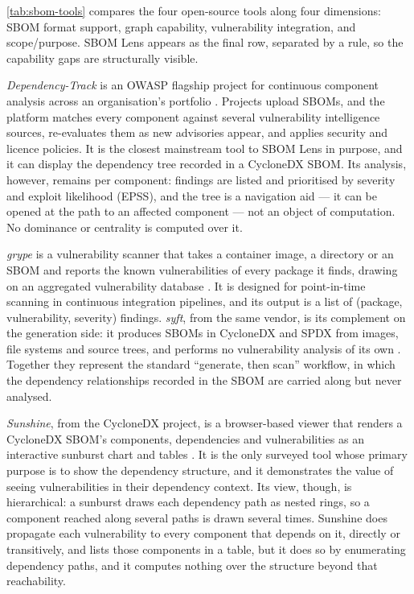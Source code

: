 \autoref{tab:sbom-tools} compares the four open-source tools along four dimensions: SBOM format support, graph capability, vulnerability integration, and scope/purpose. SBOM Lens appears as the final row, separated by a rule, so the capability gaps are structurally visible.

\textit{Dependency-Track} is an OWASP flagship project for continuous component analysis across an organisation's portfolio \citep{DependencyTrack}. Projects upload SBOMs, and the platform matches every component against several vulnerability intelligence sources, re-evaluates them as new advisories appear, and applies security and licence policies. It is the closest mainstream tool to SBOM Lens in purpose, and it can display the dependency tree recorded in a CycloneDX SBOM. Its analysis, however, remains per component: findings are listed and prioritised by severity and exploit likelihood (EPSS), and the tree is a navigation aid --- it can be opened at the path to an affected component --- not an object of computation. No dominance or centrality is computed over it.

\textit{grype} is a vulnerability scanner that takes a container image, a directory or an SBOM and reports the known vulnerabilities of every package it finds, drawing on an aggregated vulnerability database \citep{Grype}. It is designed for point-in-time scanning in continuous integration pipelines, and its output is a list of (package, vulnerability, severity) findings. \textit{syft}, from the same vendor, is its complement on the generation side: it produces SBOMs in CycloneDX and SPDX from images, file systems and source trees, and performs no vulnerability analysis of its own \citep{Syft}. Together they represent the standard ``generate, then scan'' workflow, in which the dependency relationships recorded in the SBOM are carried along but never analysed.

\textit{Sunshine}, from the CycloneDX project, is a browser-based viewer that renders a CycloneDX SBOM's components, dependencies and vulnerabilities as an interactive sunburst chart and tables \citep{Sunshine}. It is the only surveyed tool whose primary purpose is to show the dependency structure, and it demonstrates the value of seeing vulnerabilities in their dependency context. Its view, though, is hierarchical: a sunburst draws each dependency path as nested rings, so a component reached along several paths is drawn several times. Sunshine does propagate each vulnerability to every component that depends on it, directly or transitively, and lists those components in a table, but it does so by enumerating dependency paths, and it computes nothing over the structure beyond that reachability.

